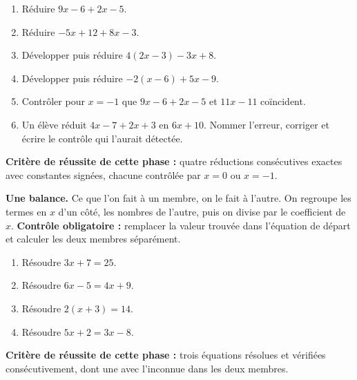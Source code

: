 \documentclass[10pt,a4paper]{article}
\begin{document}
\begin{enumerate}
\needspace{18mm}
\item Réduire $9x - 6 + 2x - 5$.
\needspace{18mm}
\item Réduire $-5x + 12 + 8x - 3$.
\needspace{18mm}
\item Développer puis réduire $4(2x - 3) - 3x + 8$.
\needspace{18mm}
\item Développer puis réduire $-2(x - 6) + 5x - 9$.
\needspace{18mm}
\item Contrôler pour $x = -1$ que $9x - 6 + 2x - 5$ et $11x - 11$ coïncident.
\needspace{18mm}
\item Un élève réduit $4x - 7 + 2x + 3$ en $6x + 10$. Nommer l'erreur, corriger et écrire le contrôle qui l'aurait détectée.
\end{enumerate}
\begin{successbox}\textbf{Critère de réussite de cette phase :} quatre réductions consécutives exactes avec constantes signées, chacune contrôlée par $x = 0$ ou $x = -1$.\end{successbox}
\certline
\needspace{62mm}\par\vspace{3mm}
\begin{methodbox}
\textbf{Une balance.} Ce que l'on fait à un membre, on le fait à l'autre. On regroupe les termes en $x$ d'un
côté, les nombres de l'autre, puis on divise par le coefficient de $x$.
\textbf{Contrôle obligatoire :} remplacer la valeur trouvée dans l'équation de départ et calculer les deux membres séparément.
\end{methodbox}
\begin{enumerate}
\needspace{18mm}
\item Résoudre $3x + 7 = 25$.
\needspace{18mm}
\item Résoudre $6x - 5 = 4x + 9$.
\needspace{18mm}
\item Résoudre $2(x + 3) = 14$.
\needspace{18mm}
\item Résoudre $5x + 2 = 3x - 8$.
\end{enumerate}
\begin{successbox}\textbf{Critère de réussite de cette phase :} trois équations résolues et vérifiées consécutivement, dont une avec l'inconnue dans les deux membres.\end{successbox}
\certline
\needspace{62mm}\par\vspace{3mm}
\end{document}
